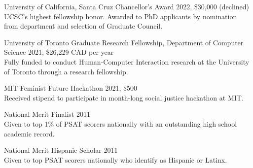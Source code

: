 University of California, Santa Cruz Chancellor's Award 2022, \$30,000 (declined) \\
UCSC's highest fellowship honor. Awarded to PhD applicants by nomination from department and selection of Graduate Council.

University of Toronto Graduate Research Fellowship, Department of Computer Science 2021, \$26,229 CAD per year \\
Fully funded to conduct Human-Computer Interaction research at the University of Toronto through a research fellowship. 

MIT Feminist Future Hackathon 2021, \$500 \\
Received stipend to participate in month-long social justice hackathon at MIT. 


National Merit Finalist 2011 \\
Given to top 1\% of PSAT scorers nationally with an outstanding high school academic record. 

National Merit Hispanic Scholar 2011 \\
Given to top PSAT scorers nationally who identify as Hispanic or Latinx. 